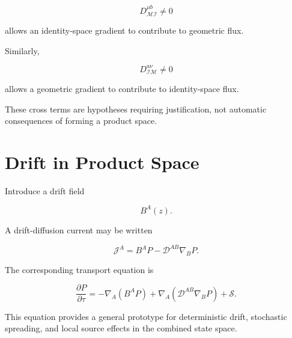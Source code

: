 \documentclass[12pt,oneside]{book}
\begin{document}
\begin{equation}
    D_{\mathcal{MI}}^{\mu b}
    \neq
    0
\end{equation}

allows an identity-space gradient to contribute to geometric
flux.

Similarly,

\begin{equation}
    D_{\mathcal{IM}}^{a\nu}
    \neq
    0
\end{equation}

allows a geometric gradient to contribute to identity-space
flux.

These cross terms are hypotheses requiring justification, not
automatic consequences of forming a product space.


\section{Drift in Product Space}
\label{sec:product-space-drift}

Introduce a drift field

\begin{equation}
    B^A(z).
\end{equation}

A drift-diffusion current may be written

\begin{equation}
    \mathcal{J}^A
    =
    B^A P
    -
    \mathcal{D}^{AB}
    \nabla_B P.
    \label{eq:product-drift-diffusion-current}
\end{equation}

The corresponding transport equation is

\begin{equation}
    \frac{\partial P}{\partial\tau}
    =
    -
    \nabla_A
    \left(
        B^A P
    \right)
    +
    \nabla_A
    \left(
        \mathcal{D}^{AB}
        \nabla_B P
    \right)
    +
    \mathcal{S}.
    \label{eq:product-drift-diffusion}
\end{equation}

This equation provides a general prototype for deterministic
drift, stochastic spreading, and local source effects in the
combined state space.

\end{document}
